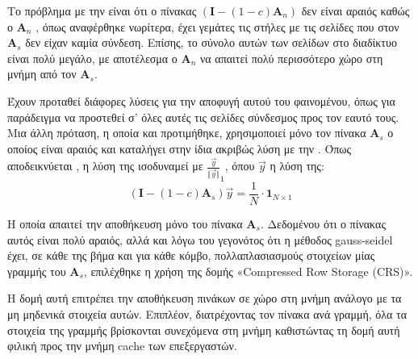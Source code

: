 Το πρόβλημα με την  είναι ότι ο πίνακας $(\bm{I}-(1-c)\bm{A}_n)$ δεν είναι αραιός καθώς ο $\bm{A}_n$ , όπως αναφέρθηκε νωρίτερα, έχει γεμάτες τις στήλες με τις σελίδες που στον $\bm{A}_s$ δεν είχαν καμία σύνδεση. Επίσης, το σύνολο αυτών των σελίδων στο διαδίκτυο είναι πολύ μεγάλο\parencite{eiron2004ranking}, με αποτέλεσμα ο $\bm{A}_n$ να απαιτεί πολύ περισσότερο χώρο στη μνήμη από τον $\bm{A}_s$.

Έχουν προταθεί διάφορες λύσεις για την αποφυγή αυτού του φαινομένου, όπως για παράδειγμα να προστεθεί σ' όλες αυτές τις σελίδες σύνδεσμος προς τον εαυτό τους. Μια άλλη πρόταση, η οποία και προτιμήθηκε, χρησιμοποιεί μόνο τον πίνακα $\bm{A}_s$ ο οποίος είναι αραιός και καταλήγει στην ίδια ακριβώς λύση με την . Όπως αποδεικνύεται \parencite{del2005fast}, η λύση της  ισοδυναμεί με $\frac{\vec{y}}{\Vert\vec{y}\Vert}_1$, όπου $\vec{y}$ η λύση της:
\begin{equation}\label{eq:2}
(\bm{I}-(1-c)\bm{A}_s)\vec{y} = \frac{1}{N}\cdot\bm{1}_{N\times1}
\end{equation}

H οποία απαιτεί την αποθήκευση μόνο του πίνακα $\bm{A}_s$. Δεδομένου ότι ο πίνακας αυτός είναι πολύ αραιός, αλλά και λόγω του γεγονότος ότι η μέθοδος gauss-seidel έχει, σε κάθε της βήμα και για κάθε κόμβο, πολλαπλασιασμούς στοιχείων μίας γραμμής του $\bm{A}_s$, επιλέχθηκε η χρήση της δομής «Compressed Row Storage (CRS)». 

Η δομή αυτή επιτρέπει την αποθήκευση πινάκων σε χώρο στη μνήμη ανάλογο με τα μη μηδενικά στοιχεία αυτών. Επιπλέον, διατρέχοντας τον πίνακα ανά γραμμή, όλα τα στοιχεία της γραμμής βρίσκονται συνεχόμενα στη μνήμη καθιστώντας τη δομή αυτή φιλική προς την μνήμη cache των επεξεργαστών.